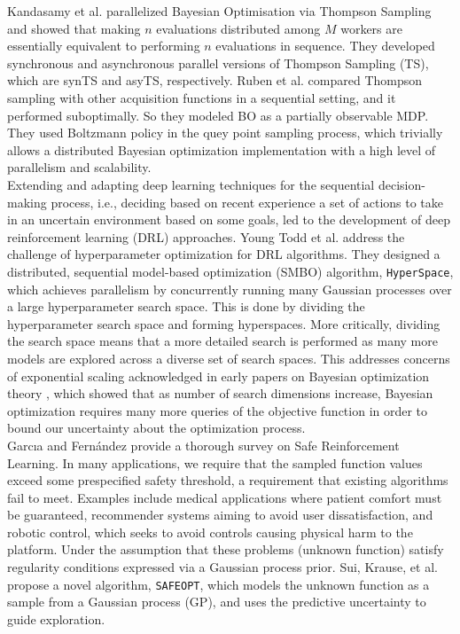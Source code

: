 Kandasamy et al.\cite{pmlr-v84-kandasamy18a} parallelized Bayesian Optimisation via Thompson Sampling and showed that making $n$ evaluations distributed among $M$ workers are essentially equivalent to performing $n$ evaluations in sequence. 
They developed synchronous and asynchronous parallel versions of Thompson Sampling (TS), which are synTS and asyTS, respectively.
Ruben et al.\cite{Ruben.distr.bo} compared Thompson sampling with other acquisition functions in a sequential setting, and it performed suboptimally. So they modeled BO as a partially observable MDP. They used Boltzmann policy in the quey point sampling process, which trivially allows a distributed Bayesian optimization implementation with a high level of parallelism and scalability.\\

Extending and adapting deep learning techniques for the sequential decision-making process, i.e., deciding based on recent experience a set of actions to take in an uncertain environment based on some goals, led to the development of deep reinforcement learning (DRL) approaches. 
Young Todd et al.\cite{YoungHRK18} address the challenge of hyperparameter optimization for DRL algorithms. They designed a distributed, sequential model-based optimization (SMBO) algorithm, \texttt{HyperSpace}, which achieves parallelism by concurrently running many Gaussian processes over a large hyperparameter search space. 
This is done by dividing the hyperparameter search space and forming hyperspaces. 
More critically, dividing the search space means that a more detailed search is performed as many more models are explored across a diverse set of search spaces. 
This addresses concerns of exponential scaling acknowledged in early papers on Bayesian optimization theory \cite{pmlr-v9-grunewalder10a} \cite{Srinivas.2012}, which showed that as number of search dimensions increase, Bayesian optimization requires many more queries of the objective function in order to bound our uncertainty about the optimization process.\\

Garcıa and Fernández \cite{garcia15a} provide a thorough survey on Safe Reinforcement Learning. 
In many applications, we require that the sampled function values exceed some prespecified safety threshold, a requirement that existing algorithms fail to meet. 
Examples include medical applications where patient comfort must be guaranteed, recommender systems aiming to avoid user dissatisfaction, and robotic control, which seeks to avoid controls causing physical harm to the platform. 
Under the assumption that these problems (unknown function) satisfy regularity conditions expressed via a Gaussian process prior. 
Sui, Krause, et al.\cite{SuiGBK15} propose a novel algorithm, \texttt{SAFEOPT}, which models the unknown function as a sample from a Gaussian process (GP), and uses the predictive uncertainty to guide exploration.\\

